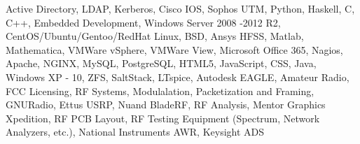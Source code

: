 
\begin{cventries}
    \begin{cvitems}
        \footnotesize
    \item {Active Directory, LDAP, Kerberos, Cisco IOS, Sophos UTM, Python, Haskell, C, C++, Embedded Development, Windows Server 2008 -2012 R2, CentOS/Ubuntu/Gentoo/RedHat Linux, BSD, Ansys HFSS, Matlab, Mathematica, VMWare vSphere, VMWare View, Microsoft Office 365, Nagios, Apache, NGINX, MySQL, PostgreSQL, HTML5, JavaScript, CSS, Java, Windows XP - 10, ZFS, SaltStack, LTspice, Autodesk EAGLE, Amateur Radio, FCC Licensing, RF Systems, Modulalation, Packetization and Framing, GNURadio, Ettus USRP, Nuand BladeRF, RF Analysis, Mentor Graphics Xpedition, RF PCB Layout, RF Testing Equipment (Spectrum, Network Analyzers, etc.), National Instruments AWR, Keysight ADS}
    \end{cvitems}
\end{cventries}
